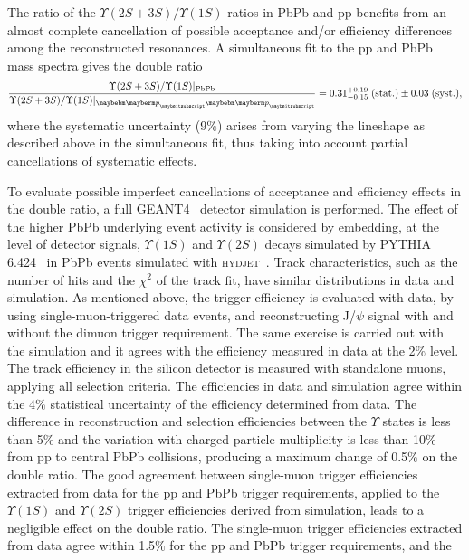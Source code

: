 The ratio of the $\Upsilon(2S+3S)/\Upsilon(1S)$ ratios in PbPb and pp benefits from an almost complete cancellation of possible acceptance 
and/or efficiency differences among the reconstructed resonances. A simultaneous fit to the pp and PbPb mass spectra gives the double ratio
\begin{equation}
  \frac{\Upsilon(2S+3S)/\Upsilon(1S)|_{\rm PbPb}}{\Upsilon(2S+3S)/\Upsilon(1S)|_{\Pp\Pp}}
 = 0.31 _{-0.15}^{+0.19} \; ({\rm stat.}) \pm 0.03 \; ({\rm syst.}),
\label{eq:double}
\end{equation}
where the systematic uncertainty (9$\%$) arises from varying the lineshape as described above in the simultaneous fit, 
thus taking into account partial cancellations of systematic effects.

To evaluate possible imperfect cancellations of acceptance and efficiency effects in the double ratio, a full GEANT4~\cite{Agostinelli:2002hh} detector 
simulation is performed. The effect of the higher PbPb underlying event activity is considered by embedding, at the level of detector signals, $\Upsilon(1S)$ 
and $\Upsilon(2S)$ decays simulated by PYTHIA 6.424~\cite{Sjostrand:2006za} in PbPb events simulated with \textsc{hydjet}~\cite{Lokhtin:2005px}. 
Track characteristics, such as the number of hits and the $\chi^2$ of the track fit, have similar distributions in data and simulation. As mentioned above, the 
trigger efficiency is evaluated with data, by using single-muon-triggered data events, and reconstructing J/$\psi$ signal with and without the dimuon trigger requirement. 
The same exercise is carried out with the simulation and it agrees with the efficiency measured in data at the 2$\%$ level. The track efficiency in the silicon detector 
is measured with standalone muons, applying all selection criteria. The efficiencies in data and simulation agree within the 4$\%$ statistical uncertainty of the 
efficiency determined from data.
The difference in reconstruction and selection efficiencies between the $\Upsilon$ states is less than 5$\%$ and the variation with charged particle multiplicity is less 
than 10$\%$ from pp to central PbPb collisions, producing a maximum change of 0.5$\%$ on the double ratio. The good agreement between single-muon trigger efficiencies 
extracted from data for the pp and PbPb trigger requirements, applied to the $\Upsilon(1S)$ and $\Upsilon(2S)$ trigger efficiencies derived from simulation, leads to a 
negligible effect on the double ratio. The single-muon trigger efficiencies extracted from data agree within 1.5$\%$ for the pp and PbPb trigger requirements, and the 
